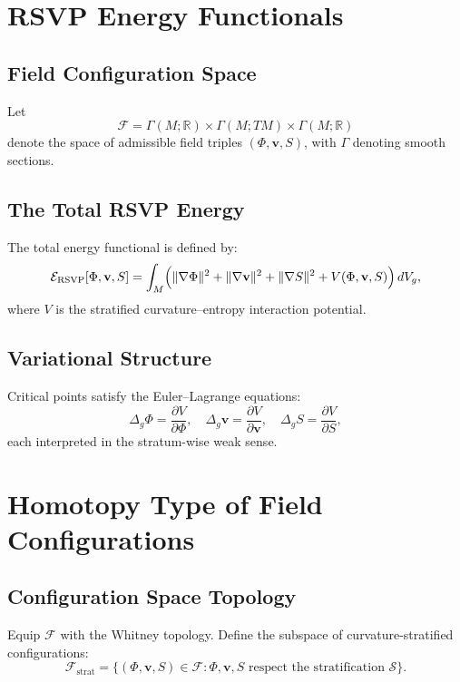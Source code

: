 \section{RSVP Energy Functionals}

\subsection{Field Configuration Space}

Let
\[
\mathcal{F} = \Gamma(M;\mathbb{R}) \times \Gamma(M;TM) \times \Gamma(M;\mathbb{R})
\]
denote the space of admissible field triples $(\Phi,\mathbf{v},S)$, with $\Gamma$ denoting smooth sections.

\subsection{The Total RSVP Energy}

The total energy functional is defined by:
\[
\mathcal{E}_{\mathrm{RSVP}}[\Phi,\mathbf{v},S]
=
\int_M
\Bigl(
\|\nabla\Phi\|^2
+
\|\nabla\mathbf{v}\|^2
+
\|\nabla S\|^2
+
V(\Phi,\mathbf{v},S)
\Bigr)\, dV_g,
\]
where $V$ is the stratified curvature–entropy interaction potential.

\subsection{Variational Structure}

Critical points satisfy the Euler–Lagrange equations:
\[
\Delta_g\Phi = \frac{\partial V}{\partial \Phi},\quad
\Delta_g\mathbf{v} = \frac{\partial V}{\partial \mathbf{v}},\quad
\Delta_g S = \frac{\partial V}{\partial S},
\]
each interpreted in the stratum-wise weak sense.

\section{Homotopy Type of Field Configurations}

\subsection{Configuration Space Topology}

Equip $\mathcal{F}$ with the Whitney topology. Define the subspace of curvature-stratified configurations:
\[
\mathcal{F}_{\mathrm{strat}}
=
\{
(\Phi,\mathbf{v},S) \in \mathcal{F} : \Phi,\mathbf{v},S \text{ respect the stratification } \mathcal{S}
\}.
\]


